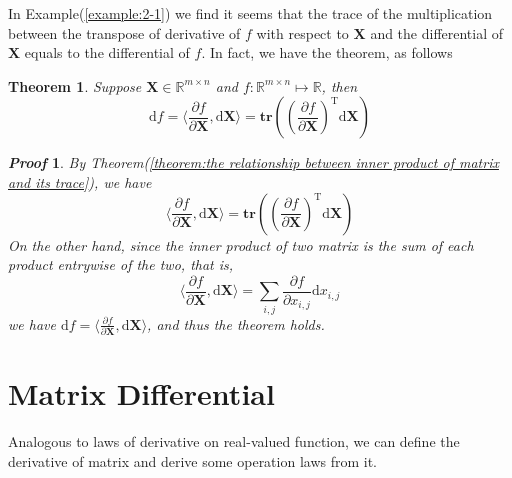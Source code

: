 \documentclass{article}
\newcommand{\Transpose}{\ensuremath{\mathrm{T}}}
\newcommand{\Trace}{\ensuremath{\mathbf{tr}}}
\newcommand{\Differential}{\ensuremath{\mathrm{d}}}
\newcommand{\MatrixSymbol}[1]{\ensuremath{{\boldsymbol{#1}}}}
\newcommand{\MatrixX}{\MatrixSymbol{X}}
\newtheorem{Theorem}{Theorem}[section]
\theoremstyle{nonumberplain}
\newtheorem{Proof}{\textit{\textbf{Proof}}}
\begin{document}
In {\sc Example}(\ref{example:2-1}) we find it seems that the trace of the multiplication between the transpose of derivative of $f$ with respect to $\MatrixX$ and the differential of $\MatrixX$ equals to the differential of $f$. In fact, we have the theorem, as follows
\begin{Theorem}
    Suppose $\MatrixX\in\mathbb{R}^{m\times n}$ and $f:\mathbb{R}^{m\times n}\mapsto \mathbb{R}$, then
    \begin{equation}
        \Differential f=\langle\frac{\partial f}{\partial \MatrixX},\Differential \MatrixX\rangle=\Trace\left(
            \left(\frac{\partial f}{\partial \MatrixX}\right)^\Transpose \Differential \MatrixX
        \right) 
    \end{equation}
\end{Theorem} 
\begin{Proof}
    By {\sc Theorem}(\ref{theorem:the relationship between inner product of matrix and its trace}), we have
    \begin{equation*}
        \langle\frac{\partial f}{\partial \MatrixX},\Differential \MatrixX\rangle=\Trace\left(
            \left(\frac{\partial f}{\partial \MatrixX}\right)^\Transpose \Differential \MatrixX
        \right) 
    \end{equation*}
    On the other hand, since the inner product of two matrix is the sum of each product entrywise of the two, that is, 
    \begin{equation*}
        \langle\frac{\partial f}{\partial \MatrixX},\Differential \MatrixX\rangle=\sum_{i,j} \frac{\partial f}{\partial x_{i,j}} \Differential x_{i,j}
    \end{equation*}
    we have $\Differential f=\langle\frac{\partial f}{\partial \MatrixX},\Differential \MatrixX\rangle$, and thus the theorem holds.
\end{Proof}


\section{Matrix Differential}
Analogous to laws of derivative on real-valued function, we can define the derivative of matrix and derive some operation laws from it.
\end{document}
